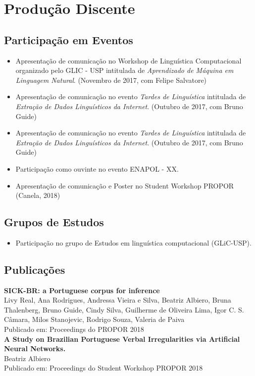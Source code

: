 \chapter{Produção Discente}
\label{ch:02-atividadesacademicas}

\section{Participação em Eventos}
\begin{itemize}
\item Apresentação de comunicação no Workshop de Linguística Computacional organizado pelo GLIC - USP intitulada de \textit{Aprendizado de Máquina em Linguagem Natural}. (Novembro de 2017, com Felipe Salvatore)
\item Apresentação de comunicação no evento \textit{Tardes de Linguística} intitulada de \textit{Extração de Dados Linguísticos da Internet}. (Outubro de 2017, com Bruno Guide)
\item Apresentação de comunicação no evento \textit{Tardes de Linguística} intitulada de \textit{Extração de Dados Linguísticos da Internet}. (Outubro de 2017, com Bruno Guide)
\item Participação como ouvinte no evento ENAPOL - XX.
\item Apresentação de comunicação e Poster no Student Workshop PROPOR (Canela, 2018)
\end{itemize}

\section{Grupos de Estudos}
\begin{itemize}
\item Participação no grupo de Estudos em linguística computacional (GLiC-USP).
\end{itemize}
\section{Publicações}
\textbf{SICK-BR: a Portuguese corpus for inference}\\

Livy Real, Ana Rodrigues, Andressa Vieira e Silva, Beatriz Albiero, Bruna Thalenberg, Bruno Guide, Cindy Silva, Guilherme de Oliveira Lima, Igor C. S. Câmara, Milos Stanojevic, Rodrigo Souza, Valeria de Paiva\\

Publicado em: Proceedings do PROPOR 2018\\

\textbf{A Study on Brazilian Portuguese Verbal Irregularities via Artificial Neural Networks.}\\

Beatriz Albiero\\

Publicado em: Proceedings do Student Workshop PROPOR 2018

